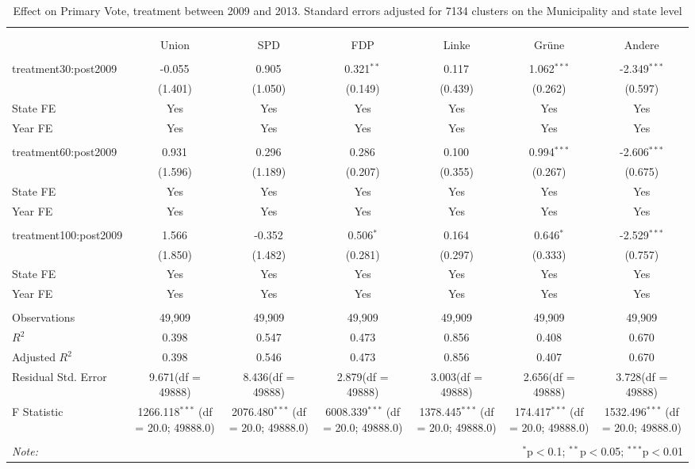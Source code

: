 \documentclass[12pt]{article}
\begin{document}
 
\begin{table}[!htbp] \centering
  \caption{Effect on Primary Vote, treatment between 2009 and 2013. Standard errors adjusted for 7134 clusters on the Municipality and state level}
\begin{tabular}{@{\extracolsep{5pt}}lcccccc}
\\[-1.8ex]\hline
\hline \\[-1.8ex]
\\[-1.8ex] & \multicolumn{1}{c}{Union} & \multicolumn{1}{c}{SPD} & \multicolumn{1}{c}{FDP} & \multicolumn{1}{c}{Linke} & \multicolumn{1}{c}{Grüne} & \multicolumn{1}{c}{Andere}  \\
\hline \\[-1.8ex]
 treatment30:post2009 & -0.055$^{}$ & 0.905$^{}$ & 0.321$^{**}$ & 0.117$^{}$ & 1.062$^{***}$ & -2.349$^{***}$ \\
  & (1.401) & (1.050) & (0.149) & (0.439) & (0.262) & (0.597) \\
 State FE & Yes & Yes & Yes & Yes & Yes & Yes \\
 Year FE & Yes & Yes & Yes & Yes & Yes & Yes \\
\hline \\[-1.8ex]
 treatment60:post2009 & 0.931$^{}$ & 0.296$^{}$ & 0.286$^{}$ & 0.100$^{}$ & 0.994$^{***}$ & -2.606$^{***}$ \\
  & (1.596) & (1.189) & (0.207) & (0.355) & (0.267) & (0.675) \\
 State FE & Yes & Yes & Yes & Yes & Yes & Yes \\
 Year FE & Yes & Yes & Yes & Yes & Yes & Yes \\
\hline \\[-1.8ex]
 treatment100:post2009 & 1.566$^{}$ & -0.352$^{}$ & 0.506$^{*}$ & 0.164$^{}$ & 0.646$^{*}$ & -2.529$^{***}$ \\
  & (1.850) & (1.482) & (0.281) & (0.297) & (0.333) & (0.757) \\
 State FE & Yes & Yes & Yes & Yes & Yes & Yes \\
 Year FE & Yes & Yes & Yes & Yes & Yes & Yes \\
\hline \\[-1.8ex]
 Observations & 49,909 & 49,909 & 49,909 & 49,909 & 49,909 & 49,909 \\
 $R^2$ & 0.398 & 0.547 & 0.473 & 0.856 & 0.408 & 0.670 \\
 Adjusted $R^2$ & 0.398 & 0.546 & 0.473 & 0.856 & 0.407 & 0.670 \\
 Residual Std. Error & 9.671(df = 49888) & 8.436(df = 49888) & 2.879(df = 49888) & 3.003(df = 49888) & 2.656(df = 49888) & 3.728(df = 49888)  \\
 F Statistic & 1266.118$^{***}$ (df = 20.0; 49888.0) & 2076.480$^{***}$ (df = 20.0; 49888.0) & 6008.339$^{***}$ (df = 20.0; 49888.0) & 1378.445$^{***}$ (df = 20.0; 49888.0) & 174.417$^{***}$ (df = 20.0; 49888.0) & 1532.496$^{***}$ (df = 20.0; 49888.0) \\
\hline
\hline \\[-1.8ex]
\textit{Note:} & \multicolumn{6}{r}{$^{*}$p$<$0.1; $^{**}$p$<$0.05; $^{***}$p$<$0.01} \\
\end{tabular}
\end{table}
\end{document}
